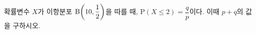 확률변수 $X$가 이항분포 $\mathrm{B}\!\left(10{,}\mkern3mu\mathopen{}\dfrac{1}{2}\right)$을 따를 때, $\mathrm{P}(X\le 2)=\dfrac{q}{p}$이다. 이때 $p+q$의 값을 구하시오. 
